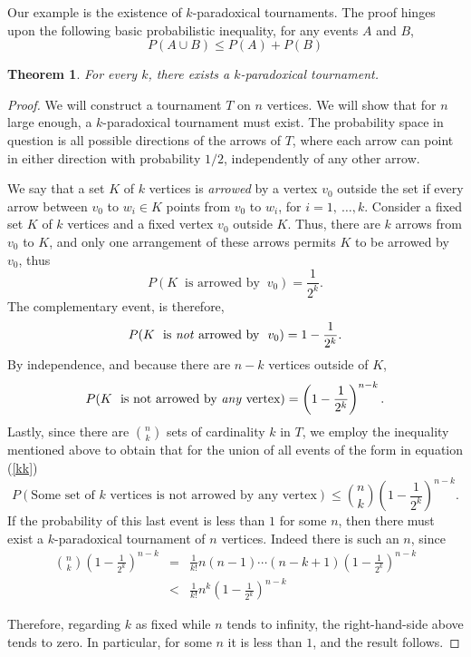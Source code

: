 \documentclass[12pt]{article}
\newtheorem{thm}{Theorem}
\theoremstyle{definition}
\theoremstyle{definition}
\theoremstyle{definition}
\begin{document}

Our example is the existence of $k$-paradoxical tournaments.  The proof hinges upon the following basic probabilistic inequality, for any events $A$ and $B$,
\[
P\left(A \cup B \right) \leq P(A) + P(B)
\]
\begin{thm}
For every $k$, there exists a $k$-paradoxical tournament.
\end{thm}
\begin{proof}
We will construct a tournament $T$ on $n$ vertices.  We will show that for $n$ large enough, a $k$-paradoxical tournament must exist.  The probability space in question is all possible directions of the arrows of $T$, where each arrow can point in either direction with probability $1/2$, independently of any other arrow.

We say that a set $K$ of $k$ vertices is \emph{arrowed} by a vertex $v_0$ outside  the set if every arrow between $v_0$ to $w_i \in K$ points from $v_0$ to $w_i$, for $i = 1, ~\ldots, k$.  Consider a fixed set $K$ of $k$ vertices and a fixed vertex $v_0$ outside $K$.  Thus, there are $k$ arrows from $v_0$ to $K$, and only one arrangement of these arrows permits $K$ to be arrowed by $v_0$, thus
\[
P(K ~\mbox{ is arrowed by }~ v_0) = \frac{1}{2^k}.
\]
The complementary event, is therefore,
\[
P(K ~\mbox{ is \emph{not} arrowed by }~ v_0) = 1 - \frac{1}{2^k}.
\]
By independence, and because there are $n - k$ vertices outside of $K$,
\begin{equation}
\label{kk}
P(K ~\mbox{ is not arrowed by \emph{any} vertex}) = \left(1 - \frac{1}{2^k}\right)^{n-k}.
\end{equation}
Lastly, since there are $\binom{n}{k}$ sets of cardinality $k$ in $T$, we employ the inequality mentioned above to obtain that for the union of all events of the form in equation (\ref{kk})
\[
P(\text{Some set of $k$ vertices is not arrowed by any vertex}) \leq \binom{n}{k}\left(1 - \frac{1}{2^k}\right)^{n-k}.
\]
If the probability of this last event is less than $1$ for some $n$, then there must exist a $k$-paradoxical tournament of $n$ vertices.  Indeed there is such an $n$, since
\begin{eqnarray*}
\binom{n}{k}\left(1 - \frac{1}{2^k}
            \right)^{n-k} &=&  \frac{1}{k!} n(n-1)
                               \cdots (n-k+1) \left(1 - \frac{1}{2^k}
                               \right)^{n-k} \\
                          &<& \frac{1}{k!} n^k \left(1 - \frac{1}{2^k}
                               \right)^{n-k} 
\end{eqnarray*}

Therefore, regarding $k$ as fixed while $n$ tends to infinity, the right-hand-side above tends to zero.  In particular, for some $n$ it is less than $1$, and the result follows.
\end{proof}
\end{document}
